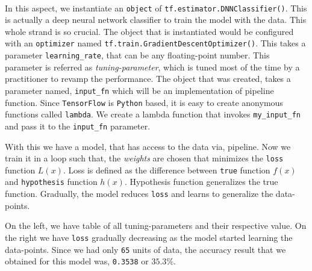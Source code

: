 \documentclass[letterpaper, 11pt]{article}
\begin{document}
\paragraph{} In this aspect, we instantiate an \texttt{object} of \verb!tf.estimator.DNNClassifier()!. This is actually a deep neural network classifier to train the model with the data. This whole strand is so crucial. The object that is instantiated would be configured with an \texttt{optimizer} named \verb!tf.train.GradientDescentOptimizer()!. This takes a parameter \verb!learning_rate!, that can be any floating-point number. This parameter is referred as \textit{tuning-parameter}, which is tuned most of the time by a practitioner to revamp the performance. The object that was created, takes a parameter named, \verb!input_fn! which will be an implementation of pipeline function. Since \texttt{TensorFlow} is \texttt{Python} based, it is easy to create anonymous functions called \texttt{lambda}. We create a lambda function that invokes \verb!my_input_fn! and pass it to the \verb!input_fn! parameter.

With this we have a model, that has access to the data via, pipeline. Now we train it in a loop such that, the \textit{weights} are chosen that minimizes the \texttt{loss} function $L(x)$. Loss is defined as the difference between \texttt{true} function $f(x)$ and \texttt{hypothesis} function $h(x)$. Hypothesis function generalizes the true function. Gradually, the model reduces \texttt{loss} and learns to generalize the data-points.
\begin{figure}[h]
\begin{floatrow}
\end{floatrow}
\end{figure}
On the left, we have table of all tuning-parameters and their respective value. On the right we have \texttt{loss} gradually decreasing as the model started learning the data-points. Since we had only \texttt{65} units of data, the accuracy result that we obtained for this model was, \texttt{0.3538} or $35.3\%$.
\end{document}
